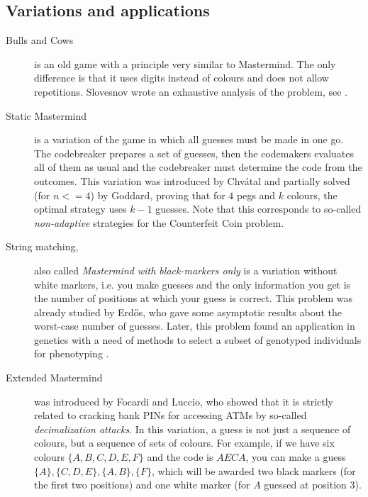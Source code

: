 \subsection{Variations and applications}

\begin{description}
\item[Bulls and Cows]
is an old game with a principle very similar to Mastermind.
The only difference is that it uses digits instead of colours and does not allow repetitions.
Slovesnov wrote an exhaustive analysis of the problem, see \cite{bullsandcows}.


\item[Static Mastermind] is a variation of the game in which all guesses
  must be made in one go.
The codebreaker prepares a set of guesses,
  then the codemakers evaluates all of them as usual and
  the codebreaker must determine the code from the outcomes.
This variation was introduced by Chvátal\cite{mm-chvatal} and
  partially solved (for $n<=4$) by Goddard\cite{mm-static},
  proving that for $4$ pegs and $k$ colours,
  the optimal strategy uses $k-1$ guesses.
Note that this corresponds to so-called \emph{non-adaptive} strategies
  for the Counterfeit Coin problem.

\item[String matching,] also called
  \emph{Mastermind with black-markers only}
  is a variation without white markers, i.e.
  you make guesses and the only information you get is the
  number of positions at which your guess is correct.
This problem was already studied by Erdős\cite{erdos-two}, who gave some
  asymptotic results about the worst-case number of guesses.
Later, this problem found an application in genetics with a need of
  methods to select a subset of genotyped individuals for phenotyping
  \cite{mm-app-gen2}\cite{mm-app-gen}.

\item[Extended Mastermind] was introduced by Focardi and Luccio,
  who showed that it is strictly related to cracking bank PINs for accessing ATMs
  by so-called \emph{decimalization attacks}\cite{mm-pins}.
In this variation, a guess is not just a sequence of colours, but a sequence of
  sets of colours. For example, if we have six colours $\{A, B, C, D, E, F\}$
  and the code is $AECA$,
  you can make a guess $\{A\}, \{C,D,E\}, \{A,B\}, \{F\}$, which
  will be awarded two black markers (for the first two positions)
  and one white marker (for $A$ guessed at position 3).
\end{description}

